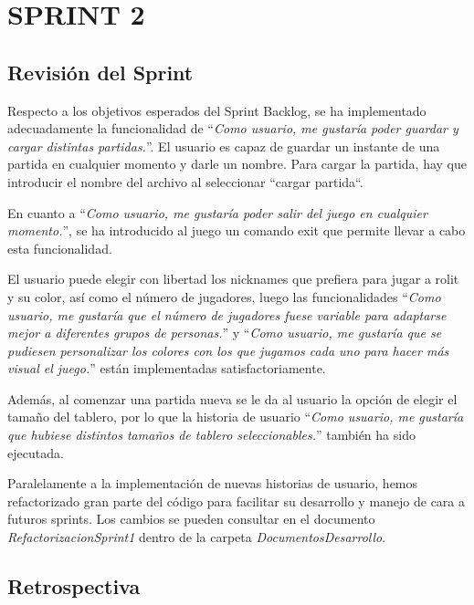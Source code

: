 \documentclass[../../SCRUM.tex]{subfiles}
\begin{document}
\section{SPRINT 2}
\subsection{Revisión del Sprint}
Respecto a los objetivos esperados del Sprint Backlog, se ha implementado adecuadamente la funcionalidad de ``\textit{Como usuario, me gustaría poder guardar y cargar distintas partidas.}''. El usuario es capaz de guardar un instante de una partida en cualquier momento y darle un nombre. Para cargar la partida, hay que introducir el nombre del archivo al seleccionar ``cargar partida``.

En cuanto a ``\textit{Como usuario, me gustaría poder salir del juego en cualquier momento.}'', se ha introducido al juego un comando exit que permite llevar a cabo esta funcionalidad.

El usuario puede elegir con libertad los nicknames que prefiera para jugar a rolit y su color, así como el número de jugadores, luego las funcionalidades ``\textit{Como usuario, me gustaría que el número de jugadores fuese variable para adaptarse mejor a diferentes grupos de personas.}'' y ``\textit{Como usuario, me gustaría que se pudiesen personalizar los colores con los que jugamos cada uno para hacer más visual el juego.}''  están implementadas satisfactoriamente.

Además, al comenzar una partida nueva se le da al usuario la opción de elegir el tamaño del tablero, por lo que la historia de usuario ``\textit{Como usuario, me gustaría que hubiese distintos tamaños de tablero seleccionables.}'' también ha sido ejecutada.

Paralelamente a la implementación de nuevas historias de usuario, hemos refactorizado gran parte del código para facilitar su desarrollo y manejo de cara a futuros sprints. Los cambios se pueden consultar en el documento \textit{RefactorizacionSprint1} dentro de la carpeta \textit{DocumentosDesarrollo}.

\subsection{Retrospectiva}
\end{document}
